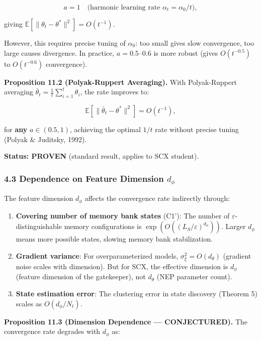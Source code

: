 \documentclass[
  12pt,
]{article}
\begin{document}
\[a = 1 \quad \text{(harmonic learning rate } \alpha_t = \alpha_0 / t \text{)},\]

giving \(\mathbb{E}[\|\theta_t - \theta^*\|^2] = O(t^{-1})\).

However, this requires precise tuning of \(\alpha_0\): too small gives
slow convergence, too large causes divergence. In practice,
\(a = 0.5\)--\(0.6\) is more robust (gives \(O(t^{-0.5})\) to
\(O(t^{-0.6})\) convergence).

\textbf{Proposition 11.2 (Polyak-Ruppert Averaging).} With
Polyak-Ruppert averaging
\(\bar{\theta}_t = \frac{1}{t}\sum_{i=1}^t \theta_i\), the rate improves
to:

\[\mathbb{E}[\|\bar{\theta}_t - \theta^*\|^2] = O(t^{-1}),\]

for \textbf{any} \(a \in (0.5, 1)\), achieving the optimal \(1/t\) rate
without precise tuning (Polyak \& Juditsky, 1992).

\textbf{Status: PROVEN} (standard result, applies to SCX student).

\subsubsection{\texorpdfstring{4.3 Dependence on Feature Dimension
\(d_\phi\)}{4.3 Dependence on Feature Dimension d\_\textbackslash phi}}\label{dependence-on-feature-dimension-d_phi}

The feature dimension \(d_\phi\) affects the convergence rate indirectly
through:

\begin{enumerate}
\def\labelenumi{\arabic{enumi}.}
\item
  \textbf{Covering number of memory bank states} (C1'): The number of
  \(\varepsilon\)-distinguishable memory configurations is
  \(\exp(O((L_S/\varepsilon)^{d_\phi}))\). Larger \(d_\phi\) means more
  possible states, slowing memory bank stabilization.
\item
  \textbf{Gradient variance}: For overparameterized models,
  \(\sigma_\xi^2 = O(d_\theta)\) (gradient noise scales with dimension).
  But for SCX, the effective dimension is \(d_\phi\) (feature dimension
  of the gatekeeper), not \(d_\theta\) (NEP parameter count).
\item
  \textbf{State estimation error}: The clustering error in state
  discovery (Theorem 5) scales as \(O(d_\phi / N_t)\).
\end{enumerate}

\textbf{Proposition 11.3 (Dimension Dependence --- CONJECTURED).} The
convergence rate degrades with \(d_\phi\) as:
\end{document}
